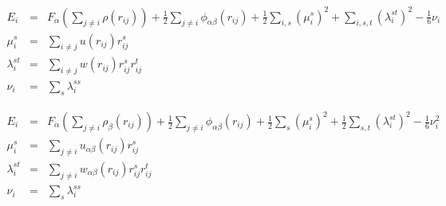 \documentclass[12pt]{article}
\begin{document}
\begin{eqnarray*}
E_{i} & = & F_{\alpha} \left( \sum_{j \ne i} \rho(r_{ij}) \right) + 
\frac{1}{2} \sum_{j \ne i} \phi_{\alpha \beta} (r_{ij}) + 
\frac{1}{2} \sum_{i,s} \left( \mu_{i}^{s} \right)^2 + 
\sum_{i,s,t} \left( \lambda_{i}^{st} \right)^2 - \frac{1}{6} \nu_{i} \\
\mu_{i}^{s} & = & \sum_{i \ne j} u(r_{ij}) r_{ij}^{s} \\
\lambda_{i}^{st} & = & \sum_{i \ne j} w(r_{ij}) r_{ij}^{s} r_{ij}^{t} \\
\nu_{i} & = & \sum_{s} \lambda_{i}^{ss}
\end{eqnarray*}

\begin{eqnarray*}
E_i & = & F_\alpha \left( \sum_{j\neq i} \rho_\beta (r_{ij}) \right) + \frac{1}{2} \sum_{j\neq i}\phi_{\alpha\beta}(r_{ij})+ \frac{1}{2} \sum_s (\mu_i^s)^2 + \frac{1}{2} \sum_{s,t} (\lambda_i^{st})^2 - \frac{1}{6} \nu_i^2 \\
%
\mu_i^s & = & \sum_{j\neq i}u_{\alpha\beta}(r_{ij})r_{ij}^s\\
%
\lambda_i^{st} & = & \sum_{j\neq i}w_{\alpha\beta}(r_{ij})r_{ij}^sr_{ij}^t\\
%
\nu_i & = & \sum_s\lambda_i^{ss}
\end{eqnarray*}
\end{document}
